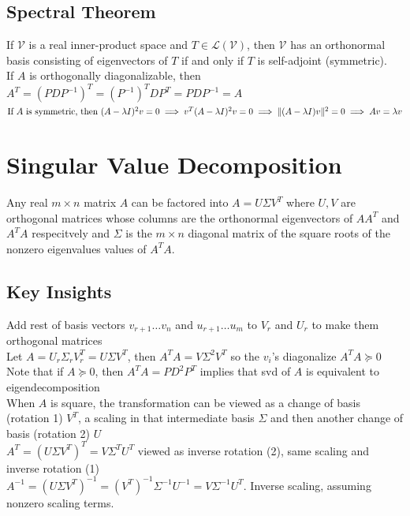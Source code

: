 \documentclass{article}
\DeclarePairedDelimiter\norm{\lVert}{\rVert}%
\newcommand{\linear}{\mathcal{L}}
\newcommand{\V}{\mathcal{V}}
\begin{document}
\subsection{Spectral Theorem}
If $\V$ is a real inner-product space and $T \in \linear(\V)$, then $\V$ has an orthonormal basis consisting of eigenvectors of $T$ if and only if $T$ is self-adjoint (symmetric). \\
If $A$ is orthogonally diagonalizable, then $A^T = (PDP^{-1})^T = (P^{-1})^TDP^T = PDP^{-1} = A$ \\
${\mbox{If } A \mbox { is symmetric, then } (A-\lambda I)^2v = 0 \implies v^T(A-\lambda I)^2v = 0 \implies \norm{(A-\lambda I)v}^2 = 0 \implies Av = \lambda v}$

\section{Singular Value Decomposition}
Any real $m \times n$ matrix $A$ can be factored into $A = U \Sigma V^T$ where $U, V$ are orthogonal matrices whose columns are the orthonormal eigenvectors of $AA^T$ and $A^TA$ respecitvely and $\Sigma$ is the $m \times n$ diagonal matrix of the square roots of the nonzero eigenvalues values of $A^TA$.

\subsection{Key Insights}
Add rest of basis vectors $v_{r+1} \ldots v_n$ and $u_{r+1} \ldots u_m$ to $V_r$ and $U_r$ to make them orthogonal matrices \\
Let $A = U_r\Sigma_r V_r^T = U\Sigma V^T$, then $A^TA = V\Sigma^2 V^T$ so the $v_i$'s diagonalize $A^TA \succeq 0$ \\
Note that if $A \succeq 0$, then $A^TA = PD^2P^T$ implies that svd of $A$ is equivalent to eigendecomposition \\ 
When $A$ is square, the transformation can be viewed as a change of basis (rotation 1) $V^T$, a scaling in that intermediate basis $\Sigma$ and then another change of basis (rotation 2) $U$ \\
$A^T = (U \Sigma V^T)^T = V \Sigma^T U^T$ viewed as inverse rotation (2), same scaling and inverse rotation (1) \\
$A^{-1} = (U \Sigma V^T)^{-1} = (V^T)^{-1} \Sigma^{-1} U^{-1} = V \Sigma^{-1} U^T$. Inverse scaling, assuming nonzero scaling terms.
\end{document}
